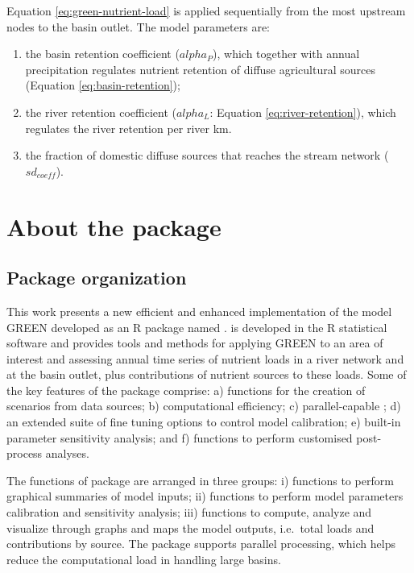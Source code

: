Equation \eqref{eq:green-nutrient-load} is applied sequentially from the most upstream nodes to the basin outlet. The model parameters are:

\begin{enumerate}
\def\labelenumi{\arabic{enumi}.}
\tightlist
\item
  the basin retention coefficient (\(alpha_P\)), which together with annual precipitation regulates nutrient retention of diffuse agricultural sources (Equation \eqref{eq:basin-retention});
\item
  the river retention coefficient (\(alpha_L\): Equation \eqref{eq:river-retention}), which regulates the river retention per river km.
\item
  the fraction of domestic diffuse sources that reaches the stream network (\(sd_{coeff}\)).
\end{enumerate}

\hypertarget{about-the-package}{%
\section{\texorpdfstring{About the  package}{About the  package}}\label{about-the-package}}

\hypertarget{package-organization}{%
\subsection{Package organization}\label{package-organization}}

\noindent This work presents a new efficient and enhanced implementation of the model GREEN developed as an R package named .  is developed in the R statistical software and provides tools and methods for applying GREEN to an area of interest and assessing annual time series of nutrient loads in a river network and at the basin outlet, plus contributions of nutrient sources to these loads. Some of the key features of the package comprise: a) functions for the creation of scenarios from data sources; b) computational efficiency; c) parallel-capable ; d) an extended suite of fine tuning options to control model calibration; e) built-in parameter sensitivity analysis; and f) functions to perform customised post-process analyses.

The functions of  package are arranged in three groups: i) functions to perform graphical summaries of model inputs; ii) functions to perform model parameters calibration and sensitivity analysis; iii) functions to compute, analyze and visualize through graphs and maps the model outputs, i.e.~total loads and contributions by source. The package supports parallel processing, which helps reduce the computational load in handling large basins.

